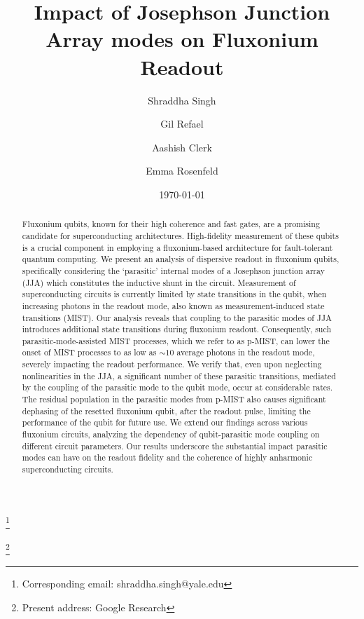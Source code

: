 \documentclass[%
reprint,
superscriptaddress,
 amsmath,amssymb,
 aps,
 prx,
longbibliography,
floatfix,
]{revtex4-2}
\begin{document}
\title{Impact of Josephson Junction Array modes on Fluxonium Readout}

\author{Shraddha Singh}\thanks{Corresponding email: shraddha.singh@yale.edu}
\author{Gil Refael}
\author{Aashish Clerk}
\author{Emma Rosenfeld}\thanks{Present address: Google Research}
\date{\today}%

\begin{abstract}
Fluxonium qubits, known for their high coherence and fast gates, are a promising candidate for superconducting architectures. High-fidelity measurement of these qubits is a crucial component in employing a fluxonium-based architecture for fault-tolerant quantum computing. We present an analysis of dispersive readout in fluxonium qubits, specifically considering the `parasitic' internal modes of a Josephson junction array (JJA) which constitutes the inductive shunt in the circuit. %
Measurement of superconducting circuits is currently limited by state transitions in the qubit, when increasing photons in the readout mode, also known as measurement-induced state transitions (MIST). 
Our analysis reveals that coupling to the parasitic modes of JJA introduces additional state transitions during fluxonium readout. Consequently, such parasitic-mode-assisted MIST processes, which we refer to as p-MIST, can lower the onset of MIST processes to as low as $\sim 10$ average photons in the readout mode, severely impacting the readout performance. We verify that, even upon neglecting nonlinearities in the JJA, a significant number of these parasitic transitions, mediated by the coupling of the parasitic mode to the qubit mode, occur at considerable rates. The residual population in the parasitic modes from p-MIST also causes significant dephasing of the resetted fluxonium qubit, after the readout pulse, limiting the performance of the qubit for future use. We extend our findings across various fluxonium circuits, analyzing the dependency of qubit-parasitic mode coupling on different circuit parameters. Our results underscore the substantial impact parasitic modes can have on the readout fidelity and the coherence of highly anharmonic superconducting circuits.
\end{abstract}
\maketitle
\end{document}
